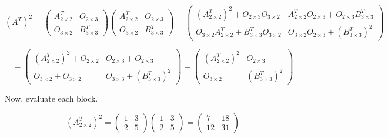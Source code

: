 \documentclass{article}
\begin{document}
\begin{equation*}
  (A^{T})^{2} = \left(
  \begin{array}{c|c}
    A_{2\times2}^{T} & O_{2\times3} \\
    \hline
    O_{3\times2} & B_{3 \times 3}^{T}
  \end{array}
  \right) \left(
  \begin{array}{c|c}
    A_{2\times2}^{T} & O_{2\times3} \\
    \hline
    O_{3\times2} & B_{3 \times 3}^{T}
  \end{array}
\right) = \left(
  \begin{array}{c|c}
    (A_{2\times2}^{T})^{2} + O_{2\times3} O_{3\times2} & A_{2\times2}^{T} O_{2 \times 3} + O_{2 \times 3} B_{3\times3}^{T} \\ \hline
   O_{3\times2} A_{2\times2}^{T} + B_{3\times3}^{T} O_{3\times2} & O_{3\times2} O_{2\times3} + (B_{3\times3}^{T})^{2}
  \end{array}
\right)
\end{equation*}

\begin{equation*}
  = \left(
  \begin{array}{c|c}
    (A_{2\times2}^{T})^{2} + O_{2\times2} & O_{2 \times 3} + O_{2 \times 3} \\ \hline
   O_{3\times2} + O_{3\times2} & O_{3\times3} + (B_{3\times3}^{T})^{2}
  \end{array}
\right) = \left(
  \begin{array}{c|c}
    (A_{2\times2}^{T})^{2} & O_{2 \times 3} \\ \hline
   O_{3\times2} & (B_{3\times3}^{T})^{2}
  \end{array}
\right)
\end{equation*}

Now, evaluate each block.

\begin{equation*}
  (A_{2\times2}^{T})^{2} =
  \begin{pmatrix}
    1 & 3 \\
    2 & 5
  \end{pmatrix} \begin{pmatrix}
    1 & 3 \\
    2 & 5
  \end{pmatrix} =
  \begin{pmatrix}
    7 & 18 \\ 12 & 31
  \end{pmatrix}
\end{equation*}
\end{document}
